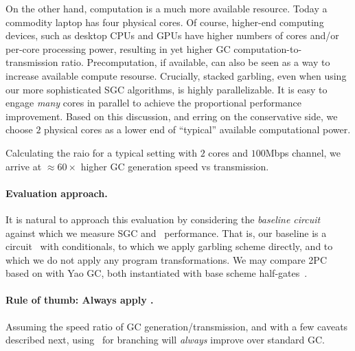 On the other hand, computation is a much more available resource.  Today a commodity laptop has four physical cores. Of course, higher-end computing devices, such as desktop CPUs and GPUs have higher numbers of cores and/or per-core processing power,
resulting in yet higher GC computation-to-transmission ratio.  Precomputation, if available, can also be seen as a way to increase available compute resourse.
Crucially, stacked garbling,  even when using our more sophisticated SGC algorithms, is highly parallelizable.
It is easy to
engage \emph{many} cores in parallel  to achieve the proportional performance improvement.
%
Based on this discussion, and erring on the conservative side, we choose $2$ physical cores as a lower end of ``typical'' available computational power. 

Calculating the raio for a typical setting with $2$ cores and $100$Mbps channel, we arrive at 
$\approx 60 \times$ higher GC generation speed vs transmission.
%

%
%






\paragraph{Evaluation approach.}  It is natural to approach this
evaluation by considering the {\em baseline circuit} against which we
measure SGC and \ourschemelong\ performance.    That is, our baseline is a
circuit \cir\ with conditionals, to which we apply garbling scheme
directly, and to which we do not apply any program transformations.
We may compare 2PC based on \ourschemelong with  Yao GC, both instantiated
with base scheme half-gates~\cite{EC:ZahRosEva15}.



\paragraph{Rule of thumb: Always apply \ourscheme.}  Assuming the
speed ratio of GC generation/transmission, and with a few caveats
described next, using \ourschemelong\ for branching will {\em always}
improve over standard GC. 

